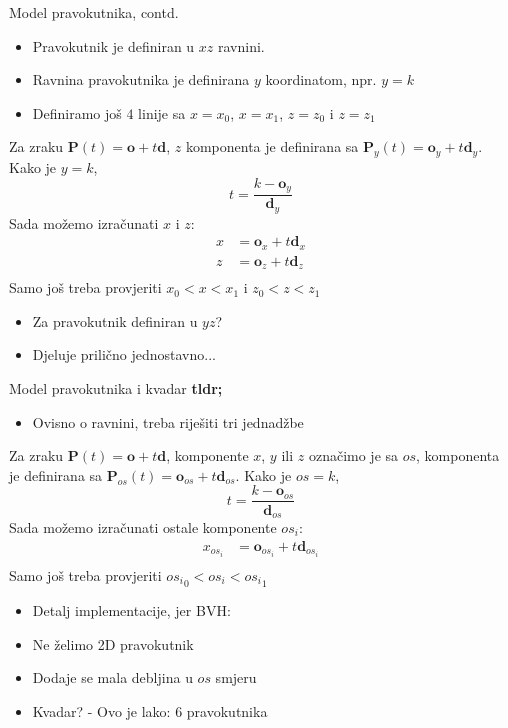 \documentclass[9pt]{beamer}
\begin{document}
\begin{frame}{Model pravokutnika, contd.}
	\begin{itemize}
		\item Pravokutnik je definiran u $xz$ ravnini.
		\item Ravnina pravokutnika je definirana $y$ koordinatom, npr. $y=k$
		\item Definiramo još $4$ linije sa $x=x_0$, $x=x_1$, $z=z_0$ i $z=z_1$
	\end{itemize}

	Za zraku $\mathbf{P}(t) = \mathbf{o} + t\mathbf{d}$, $z$ komponenta je definirana sa $\mathbf{P}_y(t) = \mathbf{o}_y + t\mathbf{d}_y$. Kako je $y=k$,
	$$
	t = \frac{k-\mathbf{o}_y}{\mathbf{d}_y}
	$$
	Sada možemo izračunati $x$ i $z$:
	\begin{align*}
	x &= \mathbf{o}_x + t\mathbf{d}_x \\
	z &= \mathbf{o}_z + t\mathbf{d}_z \\
	\end{align*}
	Samo još treba provjeriti $x_0 < x < x_1$ i $z_0 < z <z_1$
	
	\begin{itemize}
		\item Za pravokutnik definiran u $yz$?
		\item Djeluje prilično jednostavno...
	\end{itemize}
\end{frame}

\begin{frame}{Model pravokutnika i kvadar}
	\textbf{tldr;}
	
	\begin{itemize}
		\item Ovisno o ravnini, treba riješiti tri jednadžbe
	\end{itemize}

	Za zraku $\mathbf{P}(t) = \mathbf{o} + t\mathbf{d}$, komponente $x$, $y$ ili $z$ označimo je sa $os$, komponenta je definirana sa $\mathbf{P}_{os}(t) = \mathbf{o}_{os} + t\mathbf{d}_{os}$. Kako je $os=k$,
	$$
	t = \frac{k-\mathbf{o}_{os}}{\mathbf{d}_{os}}
	$$
	Sada možemo izračunati ostale komponente $os_i$:
	\begin{align*}
	x_{os_i} &= \mathbf{o}_{os_i} + t\mathbf{d}_{os_i} \\
	\end{align*}
	Samo još treba provjeriti ${os_i}_0 < {os_i} < {os_i}_1$
	
	\begin{itemize}
		\item Detalj implementacije, jer BVH:
		\item Ne želimo 2D pravokutnik
		\item Dodaje se mala debljina u $os$ smjeru 
		\item Kvadar? - Ovo je lako: $6$ pravokutnika
	\end{itemize}
\end{frame}
\end{document}
